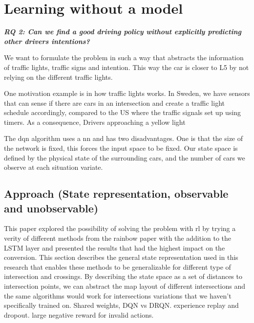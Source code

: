 \chapter{Learning without a model}
\begin{center}
\textit{\textbf{RQ 2: Can we find a good driving policy without explicitly predicting other drivers intentions?}}
\end{center}
\vspace{12pt}
We want to formulate the problem in such a way that abstracts the information of traffic lights, traffic signs and intention. This way the car is closer to L5 by not relying on the different traffic lights.

One motivation example is in how traffic lights works. In Sweden, we have sensors that can sense if there are cars in an intersection and create a traffic light schedule accordingly, compared to the US where the traffic signals set up using timers. As a consequence, Drivers approaching a yellow light 

The \gls{dqn} algorithm uses a \gls{nn} and has two disadvantages. One is that the size of the network is fixed, this forces the input space to be fixed. Our state space is defined by the physical state of the surrounding cars, and the number of cars we observe at each situation variate. %

\section{Approach (State representation, observable and unobservable)}
This paper explored the possibility of solving the problem with \gls{rl} by trying a verity of different methods from the rainbow paper with the addition to the LSTM layer and presented the results that had the highest impact on the conversion. 
This section describes the general state representation used in this research that enables these methods to be generalizable for different type of intersection and crossings. 
By describing the state space as a set of distances to intersection points, we can abstract the map layout of different intersections and the same algorithms would work for intersections variations that we haven't specifically trained on. 
Shared weights, DQN vs DRQN. 
experience replay and dropout. 
large negative reward for invalid actions.
